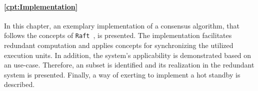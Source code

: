 \paragraph{\autoref{cpt:Implementation}}
In this chapter, an exemplary implementation of a consensus algorithm, that follows the concepts of \texttt{Raft}~\cite{RaftConsensusPaper}, is presented.
The implementation facilitates redundant computation and applies  concepts for synchronizing the utilized execution units.
In addition, the system's applicability is demonstrated based on an  use-case.
Therefore, an  subset is identified and its realization in the redundant system is presented.
Finally, a way of exerting  to implement a hot standby is described.


